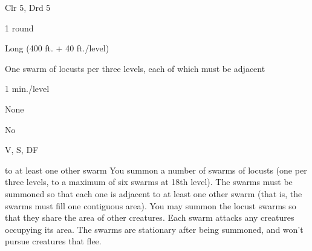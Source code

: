 
\begin{description*}
\item[Level:] Clr 5, Drd 5
\item[Casting Time:] 1 round
\item[Range:] Long (400 ft. + 40 ft./level)
\item[Effect:] One swarm of locusts per three levels, each of which must be adjacent
\item[Duration:] 1 min./level
\item[Saving Throw:] None
\item[Spell Resistance:] No
\item[Components:] V, S, DF
\end{description*}

to at least one other swarm
You summon a number of swarms of locusts (one per three levels, to a maximum of
six swarms at 18th level). The swarms must be summoned so that each one is adjacent
to at least one other swarm (that is, the swarms must fill one contiguous area).
You may summon the locust swarms so that they share the area of other creatures.
Each swarm attacks any creatures occupying its area. The swarms are stationary
after being summoned, and won't pursue creatures that flee.